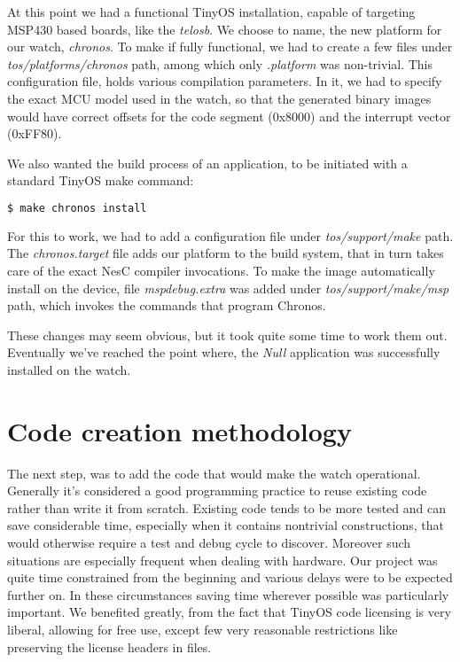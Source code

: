 At this point we had a functional TinyOS installation, capable of targeting MSP430 based boards, like the \emph{telosb}. We choose to name, the new platform for our watch, \emph{chronos}. To make if fully functional, we had to create a few files under \emph{tos/platforms/chronos} path, among which only \emph{.platform} was non-trivial. This configuration file, holds various compilation parameters. In it, we had to specify the exact MCU model used in the watch, so that the generated binary images would have correct offsets for the code segment (0x8000) and the interrupt vector (0xFF80).

We also wanted the build process of an application, to be initiated with a standard TinyOS make command:
\begin{lstlisting}[numbers=none, language=bash]
  $ make chronos install
\end{lstlisting}
For this to work, we had to add a configuration file under \emph{tos/support/make} path. The \emph{chronos.target} file adds our platform to the build system, that in turn takes care of the exact NesC compiler invocations. To make the image automatically install on the device, file \emph{mspdebug.extra} was added under \emph{tos/support/make/msp} path, which invokes the commands that program Chronos.

These changes may seem obvious, but it took quite some time to work them out. Eventually we've reached the point where, the \emph{Null} application was successfully installed on the watch.

\section{Code creation methodology}

The next step, was to add the code that would make the watch operational. Generally it's considered a good programming practice to reuse existing code rather than write it from scratch. Existing code tends to be more tested and can save considerable time, especially when it contains nontrivial constructions, that would otherwise require a test and debug cycle to discover. Moreover such situations are especially frequent when dealing with hardware. Our project was quite time constrained from the beginning and various delays were to be expected further on. In these circumstances saving time wherever possible was particularly important. We benefited greatly, from the fact that TinyOS code licensing is very liberal, allowing for free use, except few very reasonable restrictions like preserving the license headers in files.

